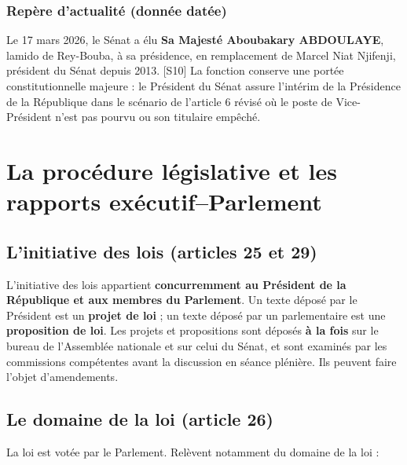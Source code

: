 \documentclass[11pt,a4paper,oneside]{report}
\newcommand{\src}[1]{\textcolor{bluec}{\scriptsize[#1]}}
\begin{document}
\subsection{Repère d'actualité (donnée datée)}
Le 17 mars 2026, le Sénat a élu \textbf{Sa Majesté Aboubakary ABDOULAYE}, lamido de Rey-Bouba, à sa présidence, en remplacement de Marcel Niat Njifenji, président du Sénat depuis 2013. \src{S10} La fonction conserve une portée constitutionnelle majeure : le Président du Sénat assure l'intérim de la Présidence de la République dans le scénario de l'article 6 révisé où le poste de Vice-Président n'est pas pourvu ou son titulaire empêché.

\chapter{La procédure législative et les rapports exécutif–Parlement}
\section{L'initiative des lois (articles 25 et 29)}
L'initiative des lois appartient \textbf{concurremment au Président de la République et aux membres du Parlement}. Un texte déposé par le Président est un \textbf{projet de loi} ; un texte déposé par un parlementaire est une \textbf{proposition de loi}. Les projets et propositions sont déposés \textbf{à la fois} sur le bureau de l'Assemblée nationale et sur celui du Sénat, et sont examinés par les commissions compétentes avant la discussion en séance plénière. Ils peuvent faire l'objet d'amendements.

\section{Le domaine de la loi (article 26)}
La loi est votée par le Parlement. Relèvent notamment du domaine de la loi :
\end{document}

